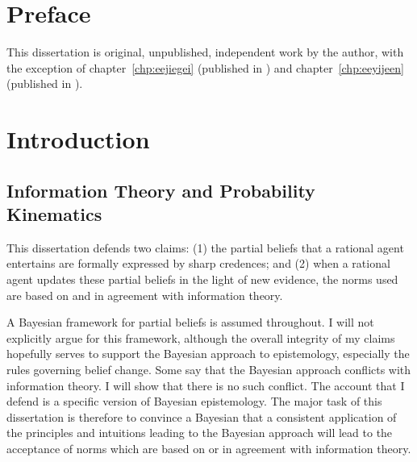 \documentclass[phd,12pt,oneside]{ubcthesis}
\begin{document}
\chapter{Preface}
\label{chp:aingiepo}

This dissertation is original, unpublished, independent work by the
author, with the exception of chapter~\ref{chp:eejiegei} (published in
) and chapter~\ref{chp:eeyijeen} (published in
).

\tableofcontents

\listoffigures


\mainmatter

\chapter{Introduction}
\label{chp:cahxahmu}

\section{Information Theory and Probability Kinematics}
\label{sec:aineichu}

This dissertation defends two claims: (1) the partial beliefs that a
rational agent entertains are formally expressed by sharp credences;
and (2) when a rational agent updates these partial beliefs in the
light of new evidence, the norms used are based on and in agreement
with information theory.

A Bayesian framework for partial beliefs is assumed throughout. I will
not explicitly argue for this framework, although the overall
integrity of my claims hopefully serves to support the Bayesian
approach to epistemology, especially the rules governing belief
change. Some say that the Bayesian approach conflicts with information
theory. I will show that there is no such conflict. The account that I
defend is a specific version of Bayesian epistemology. The major task
of this dissertation is therefore to convince a Bayesian that a consistent
application of the principles and intuitions leading to the Bayesian
approach will lead to the acceptance of norms which are based on or in
agreement with information theory.
\end{document}
